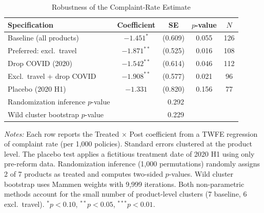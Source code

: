 \begin{table}[t]
\centering
\begin{threeparttable}
\caption{Robustness of the Complaint-Rate Estimate}
\label{tab:robust}
\small
\begin{tabular}{lcccc}
\toprule
Specification & Coefficient & SE & $p$-value & $N$ \\
\midrule
Baseline (all products) & $-1.451^{*}$ & (0.609) & 0.055 & 126 \\
Preferred: excl.\ travel & $-1.871^{**}$ & (0.525) & 0.016 & 108 \\
Drop COVID (2020) & $-1.542^{**}$ & (0.614) & 0.046 & 112 \\
Excl.\ travel + drop COVID & $-1.908^{**}$ & (0.577) & 0.021 & 96 \\
Placebo (2020 H1) & $-1.331$ & (0.820) & 0.156 & 77 \\
\midrule
Randomization inference $p$-value & \multicolumn{4}{c}{0.292} \\
Wild cluster bootstrap $p$-value & \multicolumn{4}{c}{0.229} \\
\bottomrule
\end{tabular}
\begin{tablenotes}[flushleft]
\footnotesize
\item \textit{Notes:} Each row reports the Treated $\times$ Post coefficient from a TWFE regression of complaint rate (per 1,000 policies). 
Standard errors clustered at the product level. The placebo test applies a fictitious treatment date of 2020 H1 using only pre-reform data. 
Randomization inference (1,000 permutations) randomly assigns 2 of 7 products as treated and computes two-sided $p$-values. 
Wild cluster bootstrap uses Mammen weights with 9,999 iterations. 
Both non-parametric methods account for the small number of product-level clusters (7 baseline, 6 excl.\ travel). 
$^{*}p<0.10$, $^{**}p<0.05$, $^{***}p<0.01$.
\end{tablenotes}
\end{threeparttable}
\end{table}
